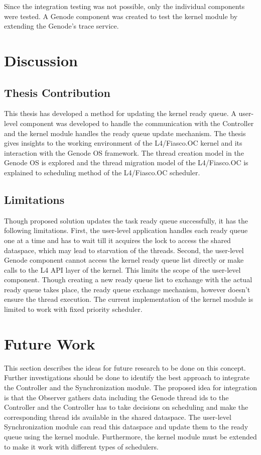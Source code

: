 Since the integration testing was not possible, only the individual components were tested. A Genode component was created to test the kernel module by extending the Genode's trace service.

\section{Discussion} \label{disc}
\subsection{Thesis Contribution}
This thesis has developed a method for updating the kernel ready queue. A user-level component was developed to handle the communication with the Controller and the kernel module handles the ready queue update mechanism. The thesis gives insights to the working environment of the L4/Fiasco.OC kernel and its interaction with the Genode OS framework. The thread creation model in the Genode OS is explored and the thread migration model of the L4/Fiasco.OC is explained to scheduling method of the L4/Fiasco.OC scheduler.

\subsection{Limitations}
Though proposed solution updates the task ready queue successfully, it has the following limitations. First, the user-level application handles each ready queue one at a time and has to wait till it acquires the lock to access the shared dataspace, which may lead to starvation of the threads. Second, the user-level Genode component cannot access the kernel ready queue list  directly or make calls to the L4 API layer of the kernel. This limits the scope of the user-level component. Though creating a new ready queue list to exchange with the actual ready queue takes place, the ready queue exchange mechanism, however doesn't ensure the thread execution. The current implementation of the kernel module is limited to work with fixed priority scheduler.

\section{Future Work}\label{futurework}
This section describes the ideas for future research to be done on this concept. Further investigations should be done to identify the best approach to integrate the Controller and the Synchronization module. The proposed idea for integration is that the Observer gathers data including the Genode thread ids to the Controller and the Controller has to take decisions on scheduling and make the corresponding thread ids available in the shared dataspace. The user-level Synchronization module can read this dataspace and update them to the ready queue using the kernel module. Furthermore, the kernel module must be extended to make it work with different types of schedulers.

